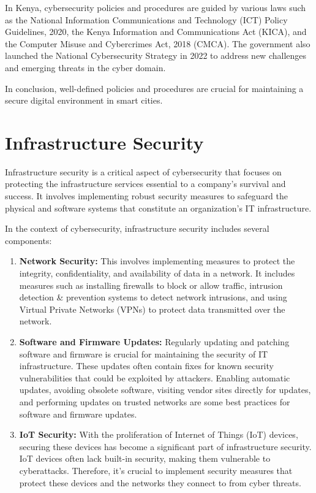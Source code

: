 \documentclass{article}
\begin{document}
In Kenya, cybersecurity policies and procedures are guided by various laws such as the National Information Communications and Technology (ICT) Policy Guidelines, 2020, the Kenya Information and Communications Act (KICA), and the Computer Misuse and Cybercrimes Act, 2018 (CMCA)\cite{mitullah-shako-associates-2022}. The government also launched the National Cybersecurity Strategy in 2022 to address new challenges and emerging threats in the cyber domain\cite{national-computer-and-cybercrimes-coordination-committee-no-date}.

In conclusion, well-defined policies and procedures are crucial for maintaining a secure digital environment in smart cities.

\section{Infrastructure Security}
Infrastructure security is a critical aspect of cybersecurity that focuses on protecting the infrastructure services essential to a company’s survival and success. It involves implementing robust security measures to safeguard the physical and software systems that constitute an organization’s IT infrastructure\cite{watts-2023}.

In the context of cybersecurity, infrastructure security includes several components:
\begin{enumerate}[label=\alph*)]
    \item \textbf{Network Security:} This involves implementing measures to protect the integrity, confidentiality, and availability of data in a network. It includes measures such as installing firewalls to block or allow traffic, intrusion detection \& prevention systems to detect network intrusions, and using Virtual Private Networks (VPNs) to protect data transmitted over the network\cite{trend-micro-network-security-measures-no-date}.
    \item \textbf{Software and Firmware Updates:} Regularly updating and patching software and firmware is crucial for maintaining the security of IT infrastructure. These updates often contain fixes for known security vulnerabilities that could be exploited by attackers. Enabling automatic updates, avoiding obsolete software, visiting vendor sites directly for updates, and performing updates on trusted networks are some best practices for software and firmware updates\cite{cybersecurity-and-infrastructure-security-agency-cisa-patches-and-software-updates-2023}\cite{watchguard-technologies-vulnerabilities-exploited-2023}.
    \item \textbf{IoT Security:} With the proliferation of Internet of Things (IoT) devices, securing these devices has become a significant part of infrastructure security. IoT devices often lack built-in security, making them vulnerable to cyberattacks. Therefore, it’s crucial to implement security measures that protect these devices and the networks they connect to from cyber threats\cite{fortinet-no-date}\cite{praveen-2023}.
\end{enumerate}
\end{document}

